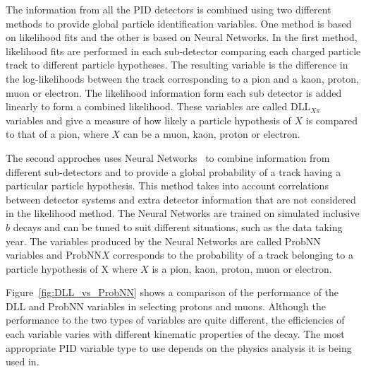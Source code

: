The information from all the PID detectors is combined using two different methods to provide global particle identification variables. One method is based on likelihood fits and the other is based on Neural Networks. In the first method, likelihood fits are performed in each sub-detector comparing each charged particle track to different particle hypotheses. The resulting variable is the difference in the log-likelihoods between the track corresponding to a pion and a kaon, proton, muon or electron. The likelihood information form each sub detector is added linearly to form a combined likelihood. 
These variables are called DLL$_{X\pi}$ variables and give a measure of how likely a particle hypothesis of $X$ is compared to that of a pion, where $X$ can be a muon, kaon, proton or electron.

The second approches uses Neural Networks~\cite{Feindt:2006pm} to combine information from different sub-detectors and to provide a global probability of a track having a particular particle hypothesis. This method takes into account correlations between detector systems and extra detector information that are not considered in the likelihood method. The Neural Networks are trained on simulated inclusive $b$ decays and can be tuned to suit different situations, such as the data taking year. The variables produced by the Neural Networks are called ProbNN variables and ProbNN$X$ corresponds to the probability of a track belonging to a particle hypothesis of X where $X$ is a pion, kaon, proton, muon or electron. 

Figure~\ref{fig:DLL_vs_ProbNN} shows a comparison of the performance of the DLL and ProbNN variables in selecting protons and muons. Although the performance to the two types of variables are quite different, the efficiencies of each variable varies with different kinematic properties of the decay. The most appropriate PID variable type to use depends on the physics analysis it is being used in. 




